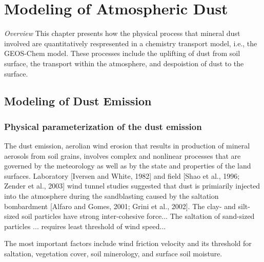 \chapter{Modeling of Atmospheric Dust}

 \textit{Overview} \hspace{0.2cm} 
 This chapter presents how the physical process that mineral dust 
 involved are quantitatively respresented in a chemistry transport model, i.e., 
 the GEOS-Chem model. These processes include the uplifting of dust from soil surface, 
 the transport within the atmosphere, and despoistion of dust to the surface. 

\section{Modeling of Dust Emission}

\subsection{Physical parameterization of the dust emission}

  The dust emission, aerolian wind erosion that results in production of mineral aerosols
  from soil grains, involves complex and nonlinear processes that are governed by the 
  meteorology as well as by the state and properties of the land surfaces. Laboratory 
  [Iversen and White, 1982] and field [Shao et al., 1996; Zender et al., 2003] wind tunnel
  studies suggested that dust is primiarily injected into the atmosphere during the 
  sandblasting caused by the saltation bombardment [Alfaro and Gomes, 2001; Grini et al.,
  2002]. The clay- and silt-sized soil particles have strong inter-cohesive force... 
  The saltation of sand-sized particles ... requires least threshold of wind speed...


  The most important factors include wind friction velocity and its threshold for 
  saltation, vegetation cover, soil minerology, and surface soil moisture. 

